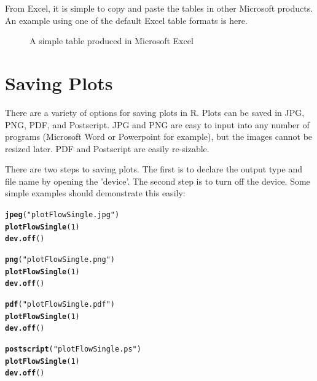 \documentclass[a4paper,11pt]{article}\usepackage{graphicx, color}
\makeatletter
\newcommand{\hlfunctioncall}[1]{\textcolor[rgb]{0.501960784313725,0,0.329411764705882}{\textbf{#1}}}%
\newcommand{\hlstring}[1]{\textcolor[rgb]{0.6,0.6,1}{#1}}%
\newenvironment{kframe}{%
 \def\at@end@of@kframe{}%
 \ifinner\ifhmode%
  \def\at@end@of@kframe{\end{minipage}}%
  \begin{minipage}{\columnwidth}%
 \fi\fi%
 \def\FrameCommand##1{\hskip\@totalleftmargin \hskip-\fboxsep
 \colorbox{shadecolor}{##1}\hskip-\fboxsep
     \hskip-\linewidth \hskip-\@totalleftmargin \hskip\columnwidth}%
 \MakeFramed {\advance\hsize-\width
   \@totalleftmargin\z@ \linewidth\hsize
   \@setminipage}}%
 {\par\unskip\endMakeFramed%
 \at@end@of@kframe}
\newenvironment{knitrout}{}{} %
\makeatother
\begin{document}
From Excel, it is simple to copy and paste the tables in other Microsoft products. An example using one of the default Excel table formats is here.

\begin{figure}[ht!]
\centering
\caption{A simple table produced in Microsoft Excel}
\label{overflow}
\end{figure}

\section{Saving Plots}
\label{app:savingPlots}
There are a variety of options for saving plots in R. Plots can be saved in JPG, PNG, PDF, and Postscript. JPG and PNG are easy to input into any number of programs (Microsoft Word or Powerpoint for example), but the images cannot be resized later. PDF and Postscript are easily re-sizable.

There are two steps to saving plots. The first is to declare the output type and file name by opening the 'device'. The second step is to turn off the device. Some simple examples should demonstrate this easily:

\begin{knitrout}
\color{fgcolor}\begin{kframe}
\begin{alltt}
\hlfunctioncall{jpeg}(\hlstring{"plotFlowSingle.jpg"})
\hlfunctioncall{plotFlowSingle}(1)
\hlfunctioncall{dev.off}()

\hlfunctioncall{png}(\hlstring{"plotFlowSingle.png"})
\hlfunctioncall{plotFlowSingle}(1)
\hlfunctioncall{dev.off}()

\hlfunctioncall{pdf}(\hlstring{"plotFlowSingle.pdf"})
\hlfunctioncall{plotFlowSingle}(1)
\hlfunctioncall{dev.off}()

\hlfunctioncall{postscript}(\hlstring{"plotFlowSingle.ps"})
\hlfunctioncall{plotFlowSingle}(1)
\hlfunctioncall{dev.off}()

\end{alltt}
\end{kframe}
\end{knitrout}
\end{document}
